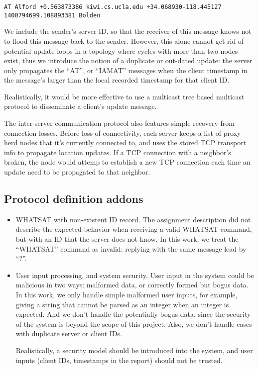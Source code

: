 \documentclass[letterpaper,twocolumn,10pt]{article}
\begin{document}
\begin{center}
{\tt AT Alford +0.563873386 kiwi.cs.ucla.edu +34.068930-118.445127 1400794699.108893381 Bolden}\\
\end{center}

We include the sender's server ID, so that the receiver of this message knows not to flood this message back to the sender. However, this alone cannot get rid of potential update loops in a topology where cycles with more than two nodes exist, thus we introduce the notion of a duplicate or out-dated update: the server only propagates the ``AT'', or ``IAMAT'' messages when the client timestamp in the message's larger than the local recorded timestamp for that client ID. 

Realistically, it would be more effective to use a multicast tree based multicast protocol to disseminate a client's update message.

The inter-server communication protocol also features simple recovery from connection losses. Before loss of connectivity, each server keeps a list of proxy herd nodes that it's currently connected to, and uses the stored TCP transport info to propagate location updates. If a TCP connection with a neighbor's broken, the node would attemp to establish a new TCP connection each time an update need to be propagated to that neighbor.

\subsection{Protocol definition addons}
\begin{itemize}
\item {WHATSAT with non-existent ID record.} The assignment description did not describe the expected behavior when receiving a valid WHATSAT command, but with an ID that the server does not know. In this work, we treat the ``WHATSAT'' command as invalid: replying with the same message lead by ``?''.
\item {User input processing, and system security.} User input in the system could be malicious in two ways: malformed data, or correctly formed but bogus data. In this work, we only handle simple malformed user inputs, for example, giving a string that cannot be parsed as an integer when an integer is expected. And we don't handle the potentially bogus data, since the security of the system is beyond the scope of this project. Also, we don't handle cases with duplicate server or client IDs. 

Realistically, a security model should be introduced into the system, and user inputs (client IDs, timestamps in the report) should not be trusted.
\end{itemize}
\end{document}
